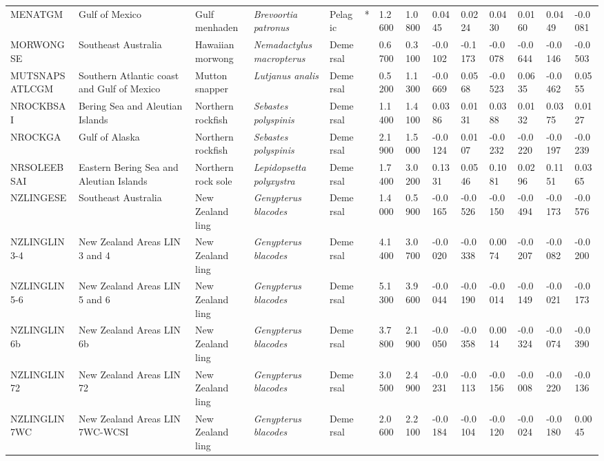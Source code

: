 \begin{longtable}{p{2.8cm}p{2cm}p{1.7cm}p{1.7cm}p{1cm}p{0.3cm}p{1cm}p{1cm}p{1cm}p{1cm}p{1cm}p{1cm}p{1cm}p{1cm}}
  MENATGM & Gulf of Mexico & Gulf menhaden & \textit{Brevoortia patronus} & Pelagic & * & 1.2600 & 1.0800 & 0.0445 & 0.0224 & 0.0430 & 0.0160 & 0.0449 & -0.0081 \\ 
  MORWONGSE & Southeast Australia & Hawaiian morwong & \textit{Nemadactylus macropterus} & Demersal &   & 0.6700 & 0.3100 & -0.0102 & -0.1173 & -0.0078 & -0.0644 & -0.0146 & -0.0503 \\ 
  MUTSNAPSATLCGM & Southern Atlantic coast and Gulf of Mexico & Mutton snapper & \textit{Lutjanus analis} & Demersal &   & 0.5200 & 1.1300 & -0.0669 & 0.0568 & -0.0523 & 0.0635 & -0.0462 & 0.0555 \\ 
  NROCKBSAI & Bering Sea and Aleutian Islands & Northern rockfish & \textit{Sebastes polyspinis} & Demersal &   & 1.1400 & 1.4100 & 0.0386 & 0.0131 & 0.0388 & 0.0132 & 0.0375 & 0.0127 \\ 
  NROCKGA & Gulf of Alaska & Northern rockfish & \textit{Sebastes polyspinis} & Demersal &   & 2.1900 & 1.5000 & -0.0124 & 0.0107 & -0.0232 & -0.0220 & -0.0197 & -0.0239 \\ 
  NRSOLEEBSAI & Eastern Bering Sea and Aleutian Islands & Northern rock sole & \textit{Lepidopsetta polyxystra} & Demersal &   & 1.7400 & 3.0200 & 0.1331 & 0.0546 & 0.1081 & 0.0296 & 0.1151 & 0.0365 \\ 
  NZLINGESE & Southeast Australia & New Zealand ling & \textit{Genypterus blacodes} & Demersal &   & 1.4000 & 0.5900 & -0.0165 & -0.0526 & -0.0150 & -0.0494 & -0.0173 & -0.0576 \\ 
  NZLINGLIN3-4 & New Zealand Areas LIN 3 and 4 & New Zealand ling & \textit{Genypterus blacodes} & Demersal &   & 4.1400 & 3.0700 & -0.0020 & -0.0338 & 0.0074 & -0.0207 & -0.0082 & -0.0200 \\ 
  NZLINGLIN5-6 & New Zealand Areas LIN 5 and 6 & New Zealand ling & \textit{Genypterus blacodes} & Demersal &   & 5.1300 & 3.9600 & -0.0044 & -0.0190 & -0.0014 & -0.0149 & -0.0021 & -0.0173 \\ 
  NZLINGLIN6b & New Zealand Areas LIN 6b & New Zealand ling & \textit{Genypterus blacodes} & Demersal &   & 3.7800 & 2.1900 & -0.0050 & -0.0358 & 0.0014 & -0.0324 & -0.0074 & -0.0390 \\ 
  NZLINGLIN72 & New Zealand Areas LIN 72 & New Zealand ling & \textit{Genypterus blacodes} & Demersal &   & 3.0500 & 2.4900 & -0.0231 & -0.0113 & -0.0156 & -0.0008 & -0.0220 & -0.0136 \\ 
  NZLINGLIN7WC & New Zealand Areas LIN 7WC-WCSI & New Zealand ling & \textit{Genypterus blacodes} & Demersal &   & 2.0600 & 2.2100 & -0.0184 & -0.0104 & -0.0120 & -0.0024 & -0.0180 & 0.0045 \\ 

\end{longtable}
